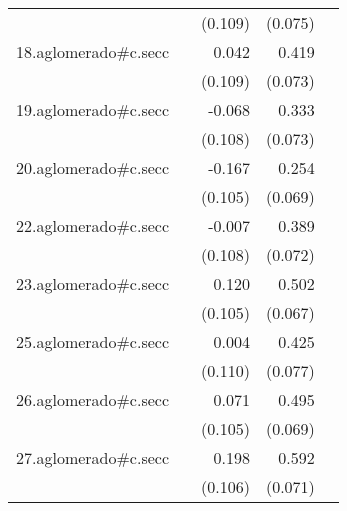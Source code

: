 {\begin{longtable}{l*{4}{D{.}{.}{-1}}}
            &                     &     (0.109)         &     (0.075)         &                     \\
\addlinespace
18.aglomerado#c.secc&                     &       0.042         &       0.419\sym{***}&                     \\
            &                     &     (0.109)         &     (0.073)         &                     \\
\addlinespace
19.aglomerado#c.secc&                     &      -0.068         &       0.333\sym{***}&                     \\
            &                     &     (0.108)         &     (0.073)         &                     \\
\addlinespace
20.aglomerado#c.secc&                     &      -0.167         &       0.254\sym{***}&                     \\
            &                     &     (0.105)         &     (0.069)         &                     \\
\addlinespace
22.aglomerado#c.secc&                     &      -0.007         &       0.389\sym{***}&                     \\
            &                     &     (0.108)         &     (0.072)         &                     \\
\addlinespace
23.aglomerado#c.secc&                     &       0.120         &       0.502\sym{***}&                     \\
            &                     &     (0.105)         &     (0.067)         &                     \\
\addlinespace
25.aglomerado#c.secc&                     &       0.004         &       0.425\sym{***}&                     \\
            &                     &     (0.110)         &     (0.077)         &                     \\
\addlinespace
26.aglomerado#c.secc&                     &       0.071         &       0.495\sym{***}&                     \\
            &                     &     (0.105)         &     (0.069)         &                     \\
\addlinespace
27.aglomerado#c.secc&                     &       0.198         &       0.592\sym{***}&                     \\
            &                     &     (0.106)         &     (0.071)         &                     \\

\end{longtable}}
